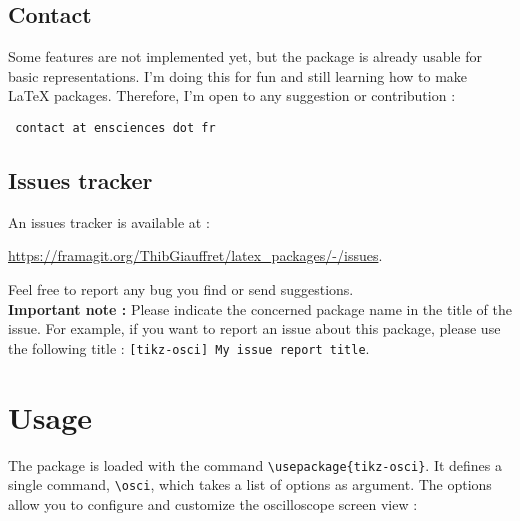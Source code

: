 \documentclass[11pt,a4paper,usenames,dvipsnames]{article}
\begin{document}
\subsection*{Contact}

Some features are not implemented yet, but the package is already usable for basic representations. I'm doing this for fun and still learning how to make \LaTeX{} packages. Therefore, I'm open to any suggestion or contribution :

\begin{center}
    \texttt{
        contact at ensciences dot fr
    }
\end{center}

\subsection*{Issues tracker}

An issues tracker is available at :
\begin{center}
    \url{https://framagit.org/ThibGiauffret/latex_packages/-/issues}.
\end{center}

Feel free to report any bug you find or send suggestions.\\

\textbf{Important note :} Please indicate the concerned package name in the title of the issue. For example, if you want to report an issue about this package, please use the following title : \texttt{[tikz-osci] My issue report title}.

\section{Usage}

The package is loaded with the command \verb|\usepackage{tikz-osci}|. It defines a single command, \verb|\osci|, which takes a list of options as argument. The options allow you to configure and customize the oscilloscope screen view :
\end{document}
